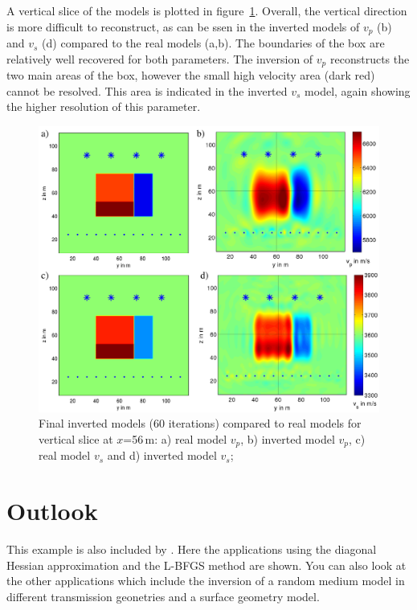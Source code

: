 A vertical slice of the models is plotted in figure~\ref{fig:toy_result2}. Overall, the vertical direction is more difficult to reconstruct, as can be ssen in the inverted models of $v_p$ (b) and $v_s$ (d) compared to the real models (a,b). The boundaries of the box are relatively well recovered for both parameters. The inversion of $v_p$ reconstructs the two main areas of the box, however the small high velocity area (dark red) cannot be resolved. This area is indicated in the inverted $v_s$ model, again showing the higher resolution of this parameter.
\begin{figure}[h!]
\begin{center}
\includegraphics[width=\textwidth]{fig_toy/toy_model_result1}
\caption[Toy example - final inverted models, vertical slice]{Final inverted models (60 iterations) compared to real models for vertical slice at $x$=56\,m: a) real model $v_p$, b) inverted  model $v_p$, c) real model $v_s$ and d) inverted model $v_s$; }\label{fig:toy_result2}
\end{center}
\end{figure}

\section{Outlook}
This example is also included by \cite{But15}. Here the applications using the diagonal Hessian approximation and the L-BFGS method are shown. You can also look at the other applications \citep{But13, But15} which include the inversion of a random medium model in different transmission geonetries and a surface geometry model.


